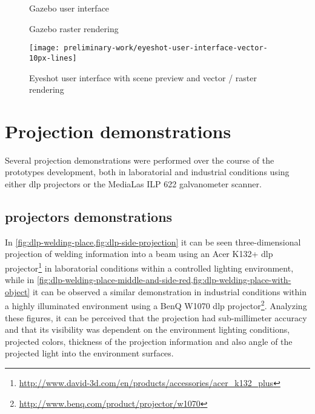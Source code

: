 \begin{figure}[H]
	\begin{floatrow}[2]
		{\caption{Gazebo user interface}\label{fig:gazebo-user-interface}}
		{\caption{Gazebo raster rendering}\label{fig:dlp-projection-image}}
	\end{floatrow}
\end{figure}

\begin{figure}[H]
	\centering
	\texttt{[image: preliminary-work/eyeshot-user-interface-vector-10px-lines]}
	\caption{Eyeshot user interface with scene preview and vector / raster rendering}
	\label{fig:eyeshot-user-interface-vector-lines}
\end{figure}



\section{Projection demonstrations}

Several projection demonstrations were performed over the course of the prototypes development, both in laboratorial and industrial conditions using either \gls{dlp} projectors or the MediaLas ILP 622 galvanometer scanner.


\subsection{ projectors demonstrations}

In \cref{fig:dlp-welding-place,fig:dlp-side-projection} it can be seen three-dimensional projection of welding information into a beam using an Acer K132+ \gls{dlp} projector\footnote{\url{http://www.david-3d.com/en/products/accessories/acer_k132_plus}} in laboratorial conditions within a controlled lighting environment, while in \cref{fig:dlp-welding-place-middle-and-side-red,fig:dlp-welding-place-with-object} it can be observed a similar demonstration in industrial conditions within a highly illuminated environment using a BenQ W1070 \gls{dlp} projector\footnote{\url{http://www.benq.com/product/projector/w1070}}. Analyzing these figures, it can be perceived that the projection had sub-millimeter accuracy and that its visibility was dependent on the environment lighting conditions, projected colors, thickness of the projection information and also angle of the projected light into the environment surfaces.

